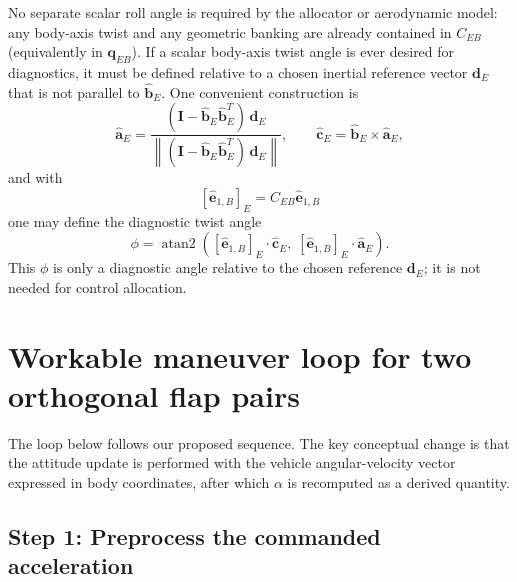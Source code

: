 No separate scalar roll angle is required by the allocator or aerodynamic model: any body-axis twist and any geometric banking are already contained in \(C_{EB}\) (equivalently in \(\mathbf q_{EB}\)). If a scalar body-axis twist angle is ever desired for diagnostics, it must be defined relative to a chosen inertial reference vector \(\mathbf d_E\) that is not parallel to \(\hat{\mathbf b}_E\). One convenient construction is
\[
\hat{\mathbf a}_E =
\frac{(\mathbf I - \hat{\mathbf b}_E \hat{\mathbf b}_E^{T}) \, \mathbf d_E}
{\left\| (\mathbf I - \hat{\mathbf b}_E \hat{\mathbf b}_E^{T}) \, \mathbf d_E \right\|},
\qquad
\hat{\mathbf c}_E = \hat{\mathbf b}_E \times \hat{\mathbf a}_E,
\]
and with
\[
[\hat{\mathbf e}_{1,B}]_E = C_{EB}\hat{\mathbf e}_{1,B}
\]
one may define the diagnostic twist angle
\[
\phi = \operatorname{atan2}
\!\left(
[\hat{\mathbf e}_{1,B}]_E \cdot \hat{\mathbf c}_E,\;
[\hat{\mathbf e}_{1,B}]_E \cdot \hat{\mathbf a}_E
\right).
\]
This \(\phi\) is only a diagnostic angle relative to the chosen reference \(\mathbf d_E\); it is not needed for control allocation.


\section{Workable maneuver loop for two orthogonal flap pairs}

The loop below follows our proposed sequence. The key conceptual change is that the attitude update is performed with the vehicle angular-velocity vector expressed in body coordinates, after which \(\alpha\) is recomputed as a derived quantity.

\subsection{Step 1: Preprocess the commanded acceleration}

